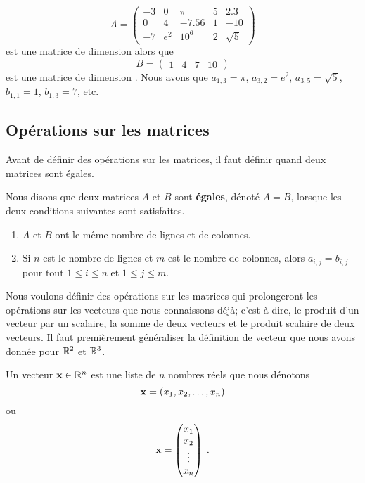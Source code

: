 {\begin{egg}
\[
A =
\begin{pmatrix}
-3 & 0 & \pi & 5 & 2.3 \\
0 & 4 & -7.56 & 1 & -10 \\
-7 & e^2 & 10^6 & 2 & \sqrt{5}
\end{pmatrix}
\]
est une matrice de dimension  alors que
\[
B =
\begin{pmatrix}
1 & 4 & 7 & 10
\end{pmatrix}
\]
est une matrice de dimension .  Nous avons que $a_{1,3} = \pi$,
$a_{3,2} = e^2$, $a_{3,5} = \sqrt{5}$, $b_{1,1} = 1$, $b_{1,3} = 7$, etc.
\end{egg}

\subsection{Opérations sur les matrices}

Avant de définir des opérations sur les matrices, il faut définir
quand deux matrices sont égales.

\begin{defn} 
Nous disons que deux matrices $A$ et $B$ sont {\bfseries égales}, dénoté
$A = B$, lorsque les deux conditions suivantes sont satisfaites.
\begin{enumerate}
\item $A$ et $B$ ont le même nombre de lignes et de colonnes.
\item Si $n$ est le nombre de lignes et $m$ est le nombre de colonnes,
alors $a_{i,j}=b_{i,j}$ pour tout $1\leq i \leq n$ et $1\leq j \leq  m$.
\end{enumerate}
\end{defn}

Nous voulons définir des opérations sur les matrices qui prolongeront les
opérations sur les vecteurs que nous connaissons déjà; c'est-à-dire, le
produit d'un vecteur par un scalaire, la somme de deux vecteurs et le
produit scalaire de deux vecteurs.   Il faut premièrement généraliser
la définition de vecteur que nous avons donnée pour $\mathbb{R}^2$ et
$\mathbb{R}^3$.

\begin{defn}
Un vecteur $\mathbf{x} \in \mathbb{R}^n$ est une liste de $n$ nombres réels que
nous dénotons
\begin{equation}\label{rowVect}
\mathbf{x} = (x_1,x_2, \ldots, x_n)
\end{equation}
ou
\begin{equation}\label{matrVect}
\mathbf{x} = \begin{pmatrix} x_1 \\ x_2 \\ \vdots \\ x_n \end{pmatrix} \; .
\end{equation}
\end{defn}

}
